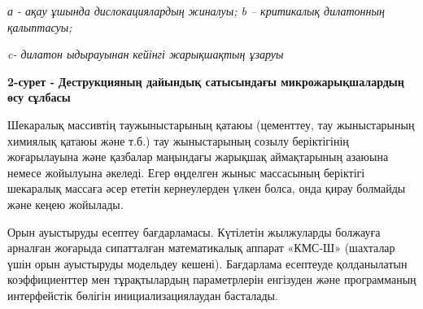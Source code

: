 
\emph{а - ақау ұшында дислокациялардың жиналуы; b -- критикалық
дилатонның қалыптасуы;}

\emph{c- дилатон ыдырауынан кейінгі жарықшақтың ұзаруы}

{\bfseries 2-сурет -} {\bfseries Деструкцияның дайындық сатысындағы
микрожарықшалардың өсу сұлбасы}

Шекаралық массивтің таужыныстарының қатаюы (цементтеу, тау жыныстарының
химиялық қатаюы және т.б.) тау жыныстарының созылу беріктігінің
жоғарылауына және қазбалар маңындағы жарықшақ аймақтарының азаюына
немесе жойылуына әкеледі. Егер өңделген жыныс массасының беріктігі
шекаралық массаға әсер ететін кернеулерден үлкен болса, онда қирау
болмайды және кеңею жойылады.

Орын ауыстыруды есептеу бағдарламасы. Күтілетін жылжуларды болжауға
арналған жоғарыда сипатталған математикалық аппарат «КМС-Ш» (шахталар
үшін орын ауыстыруды модельдеу кешені). Бағдарлама есептеуде
қолданылатын коэффициенттер мен тұрақтылардың параметрлерін енгізуден
және программаның интерфейстік бөлігін инициализациялаудан басталады.

